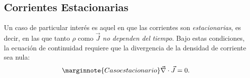 \subsection{Corrientes Estacionarias}

Un caso de particular interés es aquel en que las corrientes son
\textit{estacionarias}, es decir, en las que tanto $\rho$ como $\vec{J}$ \textit{no dependen del tiempo}. Bajo estas condiciones, la ecuación de continuidad requiere que la
divergencia de la densidad de corriente sea nula:
\begin{equation}\marginnote{Caso estacionario}
 \vec{\nabla}\cdot\vec{J}=0. \label{divJ0}
\end{equation}


%

